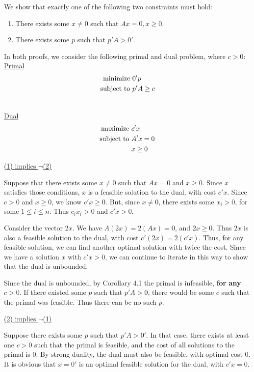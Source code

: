 We show that exactly one of the following two constraints must hold:

\begin{enumerate}
\item There exists some $x\neq 0$ such that $Ax=0, x\geq 0$.
\item There exists some $p$ such that $p'A>0'$.
\end{enumerate}

In both proofs, we consider the following primal and dual problem, where $c>0$:\\

\underline{Primal}
\begin{align}
    \text{minimize } &0'p \notag\\
    \text{subject to } &p'A\geq c\notag\\\\
\end{align}

\underline{Dual}
\begin{align}
    \text{maximize } &c'x\notag\\
    \text{subject to } &A'x=0\notag\\
                    &x\geq 0\notag\\
\end{align}

\underline{(1) implies $\neg$(2)}

Suppose that there exists some $x\neq 0$ such that $Ax=0$ and $x\geq 0$. Since $x$ satisfies those conditions, $x$ is a feasible solution to the dual, with cost $c'x$. Since $c>0$ and $x\geq 0$, we know $c'x\geq 0$. But, since $x\neq 0$, there exists some $x_i>0$, for some $1\leq i\leq n$. Thus $c_ix_i>0$ and $c'x>0$.

Consider the vector $2x$. We have $A(2x)=2(Ax)=0$, and $2x\geq 0$. Thus $2x$ is also a feasible solution to the dual, with cost $c'(2x)=2(c'x)$. Thus, for any feasible solution, we can find another optimal solution with twice the cost. Since we have a solution $x$ with $c'x>0$, we can continue to iterate in this way to show that the dual is unbounded.

Since the dual is unbounded, by Corollary 4.1 the primal is infeasible, \textbf{for any $c>0$}. If there existed some $p$ such that $p'A>0$, there would be some $c$ such that the primal was feasible. Thus there can be no such $p$.

\underline{(2) implies $\neg$(1)}

Suppose there exists some $p$ such that $p'A>0'$. In that case, there exists at least one $c>0$ such that the primal is feasible, and the cost of all solutions to the primal is $0$. By strong duality, the dual must also be feasible, with optimal cost $0$. It is obvious that $x=0'$ is an optimal feasible solution for the dual, with $c'x=0$.

